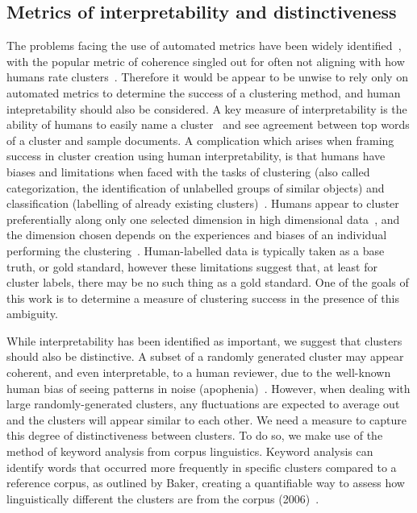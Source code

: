 \documentclass{article}
\begin{document}
\subsection{Metrics of interpretability and distinctiveness}


The problems facing the use of automated metrics have been widely identified~\cite{chang2009,lipton2018,doogan2021,hoyle2021,qiang2022}, with the popular metric of coherence singled out for often not aligning with how humans rate clusters~\cite{doogan2021,hoyle2021}. Therefore it would be appear to be unwise to rely only on automated metrics to determine the success of a clustering method, and human intepretability should also be considered.
A key measure of interpretability is the ability of humans to easily name a cluster~\cite{doogan2021} and see agreement between top words of a cluster and sample documents. 
A complication which arises when framing success in cluster creation using human interpretability, is that humans have biases and limitations when faced with the tasks of clustering (also called categorization, the identification of unlabelled groups of similar objects) and classification (labelling of already existing clusters)~\cite{anderson1991}.  Humans appear to cluster preferentially along only one selected dimension in high dimensional data~\cite{doan2023}, and the dimension chosen depends on the experiences and biases of an individual performing the clustering~\cite{broker2022}.  Human-labelled data is typically taken as a base truth, or gold standard, however these limitations suggest that, at least for cluster labels, there may be no such thing as a gold standard.  One of the goals of this work is to determine a measure of clustering success in the presence of this ambiguity.


While interpretability has been identified as important, we suggest that clusters should also be distinctive.  A subset of a randomly generated cluster may appear coherent, and even interpretable, to a human reviewer, due to the well-known human bias of seeing patterns in noise (apophenia)~\cite{clarke2008}.  However, when dealing with large randomly-generated clusters, any fluctuations are expected to average out and the clusters will appear similar to each other.    
We need a measure to capture this degree of distinctiveness between clusters. To do so, we make use of the method of keyword analysis from corpus linguistics. Keyword analysis can identify words that occurred more frequently in specific clusters compared to a reference corpus, as outlined by Baker, creating a quantifiable way to assess how linguistically different the clusters are from the corpus (2006)~\cite{baker2006using}.
\end{document}
